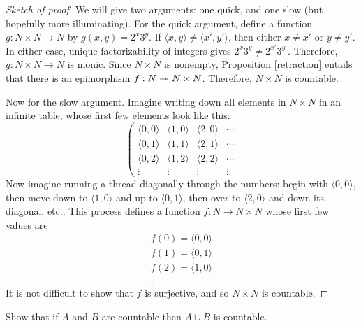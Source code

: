 \begin{proof}[Sketch of proof] We will give two arguments: one quick,
  and one slow (but hopefully more illuminating).  For the quick
  argument, define a function $g:N\times N\to N$ by $g(x,y)=2^x3^y$.
  If $\langle x,y\rangle \neq \langle x',y'\rangle$, then either
  $x\neq x'$ or $y\neq y'$.  In either case, unique factorizability of
  integers gives $2^x3^y\neq 2^{x'}3^{y'}$.  Therefore, $g:N\times
  N\to N$ is monic.  Since $N\times N$ is nonempty, Proposition
  \ref{retraction} entails that there is an epimorphism $f:N\twoheadrightarrow
  N\times N$.  Therefore, $N\times N$ is countable.



  Now for the slow argument.  Imagine writing down all elements in
  $N\times N$ in an infinite table, whose first few elements look like
  this:
\[ \left( \begin{array}{ccccc} \langle 0,0\rangle & \langle 1,0\rangle
    & \langle 2,0\rangle & \cdots
    \\
    \langle 0,1\rangle & \langle 1,1\rangle & \langle 2,1\rangle &
    \cdots
    \\
    \langle 0,2\rangle & \langle 1,2\rangle & \langle 2,2\rangle &
    \cdots
    \\
    \vdots & \vdots & \vdots & \vdots \end{array} \right. \] Now
imagine running a thread diagonally through the numbers: begin with
$\langle 0,0\rangle$, then move down to $\langle 1,0\rangle$ and up to
$\langle 0,1\rangle$, then over to $\langle 2,0\rangle$ and down its
diagonal, etc.. This process defines a function $f:N\to N\times N$
whose first few values are
\[ \begin{array}{lll}
  f(0) = \langle 0,0\rangle \\
  f(1) = \langle 0,1\rangle \\
  f(2) = \langle 1,0\rangle \\
  \vdots \end{array} \] It is not difficult to show that $f$ is
surjective, and so $N\times N$ is countable. \end{proof}

\begin{exercise} Show that if $A$ and $B$ are countable then $A\cup B$
  is countable. \end{exercise}


